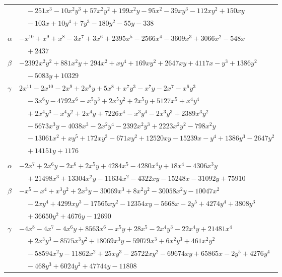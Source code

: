 \documentclass[11pt]{article}
\begin{document}
\begin{longtable}{@{}ll@{}}
 & $\quad -251x^{3}-10x^{2}y^{3}+57x^{2}y^{2}+199x^{2}y-95x^{2}-39xy^{3}-112xy^{2}+150xy$\\
 & $\quad -103x+10y^{4}+7y^{3}-180y^{2}-55y-338$\\
\addlinespace[3pt]
\multicolumn{2}{@{}l}{$\{i,j\}=\{26,51\}$, $k_{ij}=2^{7}\cdot 3\cdot 7^{2}$}\\
$\alpha$ & $-x^{10}+x^{9}+x^{8}-3x^{7}+3x^{6}+2395x^{5}-2566x^{4}-3609x^{3}+3066x^{2}-548x$\\
 & $\quad +2437$\\
$\beta$ & $-2392x^{2}y^{2}+881x^{2}y+294x^{2}+xy^{4}+169xy^{2}+2647xy+4117x-y^{3}+1386y^{2}$\\
 & $\quad -5083y+10329$\\
$\gamma$ & $2x^{11}-2x^{10}-2x^{9}+2x^{8}y+5x^{8}+x^{7}y^{3}-x^{7}y-2x^{7}-x^{6}y^{3}$\\
 & $\quad -3x^{6}y-4792x^{6}-x^{5}y^{3}+2x^{5}y^{2}+2x^{5}y+5127x^{5}+x^{4}y^{4}$\\
 & $\quad +2x^{4}y^{3}-x^{4}y^{2}+2x^{4}y+7226x^{4}-x^{3}y^{4}-2x^{3}y^{3}+2389x^{3}y^{2}$\\
 & $\quad -5673x^{3}y-4038x^{3}-2x^{2}y^{4}-2392x^{2}y^{3}+2223x^{2}y^{2}-798x^{2}y$\\
 & $\quad -13061x^{2}+xy^{5}+172xy^{3}-671xy^{2}+12520xy-15239x-y^{4}+1386y^{3}-2647y^{2}$\\
 & $\quad +14151y+1176$\\
\addlinespace[3pt]
\multicolumn{2}{@{}l}{$\{i,j\}=\{26,106\}$, $k_{ij}=2^{11}\cdot 3\cdot 5\cdot 7$}\\
$\alpha$ & $-2x^{7}+2x^{6}y-2x^{6}+2x^{5}y+4284x^{5}-4280x^{4}y+18x^{4}-4306x^{3}y$\\
 & $\quad +21498x^{3}+13304x^{2}y-11634x^{2}-4322xy-15248x-31092y+75910$\\
$\beta$ & $-x^{5}-x^{4}+x^{3}y^{2}+2x^{3}y-30069x^{3}+8x^{2}y^{2}-30058x^{2}y-10047x^{2}$\\
 & $\quad -2xy^{4}+4299xy^{3}-17565xy^{2}-12354xy-5668x-2y^{5}+4274y^{4}+3808y^{3}$\\
 & $\quad +36650y^{2}+4676y-12690$\\
$\gamma$ & $-4x^{8}-4x^{7}-4x^{6}y+8563x^{6}-x^{5}y+28x^{5}-2x^{4}y^{3}-22x^{4}y+21481x^{4}$\\
 & $\quad +2x^{3}y^{3}-8575x^{3}y^{2}+18069x^{3}y-59079x^{3}+6x^{2}y^{3}+461x^{2}y^{2}$\\
 & $\quad -58594x^{2}y-11862x^{2}+25xy^{3}-25722xy^{2}-69674xy+65865x-2y^{5}+4276y^{4}$\\
 & $\quad -468y^{3}+6024y^{2}+47744y-11808$\\

\end{longtable}
\end{document}

